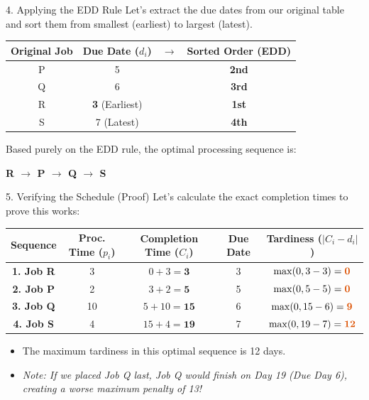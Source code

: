 \documentclass[12pt, aspectratio=169]{beamer}
\newcommand{\res}[1]{\textcolor{highlightcol}{\textbf{#1}}}
\begin{document}
\begin{frame}{4. Applying the EDD Rule}
    Let's extract the due dates from our original table and sort them from smallest (earliest) to largest (latest).
    
    \vspace{0.3cm}
    \begin{center}
    \renewcommand{\arraystretch}{1.3}
    \begin{tabular}{c c c c}
        \toprule
        \textbf{Original Job} & \textbf{Due Date ($d_i$)} & $\rightarrow$ & \textbf{Sorted Order (EDD)} \tabularnewline
        \midrule
        P & 5 & & \res{2nd} \tabularnewline
        Q & 6 & & \res{3rd} \tabularnewline
        R & \textbf{3} (Earliest) & & \res{1st} \tabularnewline
        S & 7 (Latest) & & \res{4th} \tabularnewline
        \bottomrule
    \end{tabular}
    \end{center}
    
    \vspace{0.3cm}
    Based purely on the EDD rule, the optimal processing sequence is: \\
    \begin{center}
        \Large \textbf{R $\rightarrow$ P $\rightarrow$ Q $\rightarrow$ S}
    \end{center}
\end{frame}

\begin{frame}{5. Verifying the Schedule (Proof)}
    Let's calculate the exact completion times to prove this works:
    
    \vspace{0.2cm}
    \begin{center}
    \renewcommand{\arraystretch}{1.2}
    \small
    \begin{tabular}{c c c c c}
        \toprule
        \textbf{Sequence} & \textbf{Proc. Time ($p_i$)} & \textbf{Completion Time ($C_i$)} & \textbf{Due Date} & \textbf{Tardiness ($|C_i - d_i|$)} \tabularnewline
        \midrule
        \textbf{1. Job R} & 3 & $0 + 3 = \textbf{3}$ & 3 & $\max(0, 3 - 3) = \res{0}$ \tabularnewline
        \textbf{2. Job P} & 2 & $3 + 2 = \textbf{5}$ & 5 & $\max(0, 5 - 5) = \res{0}$ \tabularnewline
        \textbf{3. Job Q} & 10 & $5 + 10 = \textbf{15}$ & 6 & $\max(0, 15 - 6) = \res{9}$ \tabularnewline
        \textbf{4. Job S} & 4 & $15 + 4 = \textbf{19}$ & 7 & $\max(0, 19 - 7) = \res{12}$ \tabularnewline
        \bottomrule
    \end{tabular}
    \end{center}
    
    \vspace{0.2cm}
    \begin{itemize}
        \item The maximum tardiness in this optimal sequence is 12 days.
        \item \textit{Note: If we placed Job Q last, Job Q would finish on Day 19 (Due Day 6), creating a worse maximum penalty of 13!}
    \end{itemize}
\end{frame}
\end{document}
